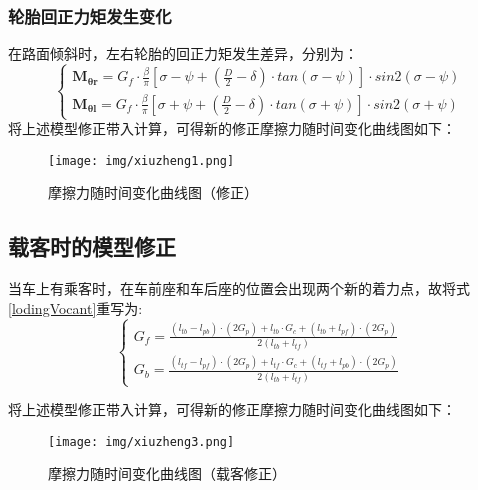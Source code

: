 \documentclass[withoutpreface,bwprint]{cumcmthesis} %
\begin{document}
\subsubsection{轮胎回正力矩发生变化}




在路面倾斜时，左右轮胎的回正力矩发生差异，分别为：
\begin{equation}
    \left\{
\begin{aligned}
\mathbf{M_{\theta r}}=G_f \cdot \frac{\beta}{\pi}[\sigma-\psi+(\frac{D}{2}-\delta)\cdot tan (\sigma-\psi)] \cdot sin2(\sigma-\psi) \\
\mathbf{M_{\theta l}}=G_f \cdot \frac{\beta}{\pi}[\sigma+\psi+(\frac{D}{2}-\delta)\cdot tan (\sigma+\psi)] \cdot sin2(\sigma+\psi)
\end{aligned}
\right.
\end{equation}
将上述模型修正带入计算，可得新的修正摩擦力随时间变化曲线图如下：

\begin{figure}[htbp]
    \centering
    \texttt{[image: img/xiuzheng1.png]}
     \captionsetup{font=small, position=below}
    \caption{摩擦力随时间变化曲线图（修正）}
\end{figure}



\subsection{载客时的模型修正}

当车上有乘客时，在车前座和车后座的位置会出现两个新的着力点，故将式\eqref{lodingVocant}重写为:
\begin{equation}
\label{lodingHolding}
\left\{
\begin{aligned}
    G_f=\frac{ (l_{tb}-l_{pb})\cdot(2G_p)+l_{tb}\cdot G_c + (l_{tb}+l_{pf})\cdot(2G_p)}
    {2(l_{tb}+l_{tf})}\\
    G_b=\frac{ (l_{tf}-l_{pf})\cdot(2G_p)+l_{tf}\cdot G_c + (l_{tf}+l_{pb})\cdot(2G_p)}
    {2(l_{tb}+l_{tf})}
\end{aligned}
\right.
\end{equation}



将上述模型修正带入计算，可得新的修正摩擦力随时间变化曲线图如下：


\begin{figure}[htbp]
    \centering
    \texttt{[image: img/xiuzheng3.png]}
     \captionsetup{font=small, position=below}
    \caption{摩擦力随时间变化曲线图（载客修正）}
\end{figure}
\end{document}
